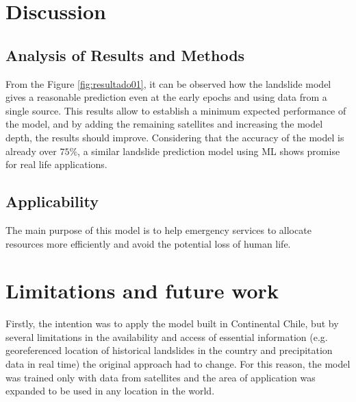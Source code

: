 \documentclass[sigconf, nonacm]{acmart}
\begin{document}


\section{Discussion}
\subsection{Analysis of Results and Methods}

From the Figure \ref{fig:resultado01}, it can be observed how the landslide model gives a reasonable prediction even at the early epochs and using data from a single source. This results allow to establish a minimum expected performance of the model, and by adding the remaining satellites and increasing the model depth, the results should improve. Considering that the accuracy of the model is already over $75\%$, a similar landslide prediction model using ML shows promise for real life applications. 

\subsection{Applicability}

The main purpose of this model is to help emergency services to allocate resources more efficiently and avoid the potential loss of human life. 

\section{Limitations and future work}

Firstly, the intention was to apply the model built in Continental Chile, but by several limitations in the availability and access of essential information (e.g. georeferenced location of historical landslides in the country and precipitation data in real time) the original approach had to change. For this reason, the model was trained only with data from satellites and the area of application was expanded to be used in any location in the world.
\end{document}
